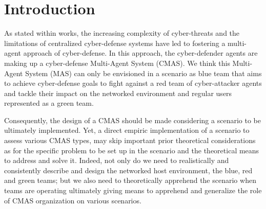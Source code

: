 \documentclass[runningheads]{llncs}
\begin{document}
\section{Introduction}



As stated within  works\cite{kott2023autonomous}, the increasing complexity of cyber-threats and the limitations of centralized cyber-defense systems have led to fostering a multi-agent approach of cyber-defense. In this approach, the cyber-defender agents are making up a cyber-defense Multi-Agent System (CMAS). We think this Multi-Agent System (MAS) can only be envisioned in a scenario as blue team that aims to achieve cyber-defense goals to fight against a red team of cyber-attacker agents and tackle their impact on the networked environment and regular users represented as a green team.

Consequently, the design of a CMAS should be made considering a scenario to be ultimately implemented. Yet, a direct empiric implementation of a scenario to assess various CMAS types, may skip important prior theoretical considerations as for the specific problem to be set up in the scenario and the theoretical means to address and solve it. Indeed, not only do we need to realistically and consistently describe and design the networked host environment, the blue, red and green teams; but we also need to theoretically apprehend the scenario when teams are operating ultimately giving means to apprehend and generalize the role of CMAS organization on various scenarios.
\end{document}
